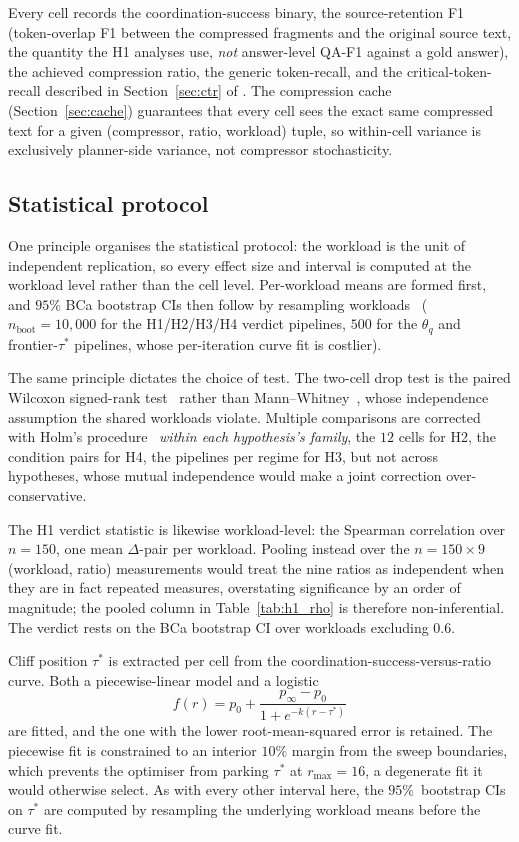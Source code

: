 Every cell records the coordination-success binary, the
source-retention F1 (token-overlap F1 between the compressed
fragments and the original source text, the quantity the H1
analyses use, \emph{not} answer-level QA-F1 against a gold
answer), the achieved compression ratio, the generic
token-recall, and the critical-token-recall described in
Section~\ref{sec:ctr} of . The
compression cache (Section~\ref{sec:cache}) guarantees that every
cell sees the exact same compressed text for a given (compressor,
ratio, workload) tuple, so within-cell variance is exclusively
planner-side variance, not compressor stochasticity.

\subsection{Statistical protocol}
\label{sec:stats}

One principle organises the statistical protocol: the workload is
the unit of independent replication, so every effect size and
interval is computed at the workload level rather than the cell level. Per-workload means are formed first, and
$95\%$ BCa bootstrap CIs then follow by resampling
workloads~\cite{efron1993bootstrap} ($n_\text{boot}=10{,}000$ for the
H1/H2/H3/H4 verdict pipelines, $500$ for the $\theta_q$ and
frontier-$\tau^{*}$ pipelines, whose per-iteration curve fit is
costlier).

The same principle dictates the choice of test. The two-cell drop
test is the paired Wilcoxon signed-rank test~\cite{wilcoxon1945}
rather than Mann--Whitney~\cite{mannwhitney1947}, whose independence
assumption the shared workloads violate. Multiple comparisons are
corrected with Holm's procedure~\cite{holm1979bonferroni}
\emph{within each hypothesis's family}, the $12$ cells for H2, the
condition pairs for H4, the pipelines per regime for H3, but not
across hypotheses, whose mutual independence would make a joint
correction over-conservative.

The H1 verdict statistic is likewise workload-level: the Spearman
correlation over $n=150$, one mean $\Delta$-pair per workload. Pooling
instead over the $n=150\times9$ (workload, ratio) measurements would
treat the nine ratios as independent when they are in fact repeated
measures, overstating significance by an order of magnitude; the
pooled column in Table~\ref{tab:h1_rho} is therefore non-inferential.
The verdict rests on the BCa bootstrap CI over workloads excluding
$0.6$.

Cliff position $\tau^{*}$ is extracted per cell from the
coordination-success-versus-ratio curve. Both a piecewise-linear
model and a logistic
\[
  f(r) = p_0 + \frac{p_\infty - p_0}{1 + e^{-k(r - \tau^{*})}}
\]
are fitted, and the one with the lower root-mean-squared error is
retained. The piecewise fit is constrained to an interior $10\%$
margin from the sweep boundaries, which prevents the optimiser from
parking $\tau^{*}$ at $r_{\max}=16$, a degenerate fit it would
otherwise select. As with every other interval here, the
$95\%$~bootstrap CIs on $\tau^{*}$ are computed by resampling the
underlying workload means before the curve fit.

